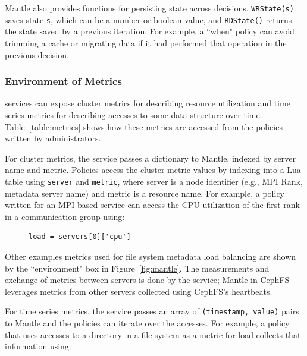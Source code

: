 Mantle also provides functions for persisting state across decisions.
\texttt{WRState(s)} saves state \texttt{s}, which can be a number or boolean
value, and \texttt{RDState()} returns the state saved by a previous iteration.
For example, a ``when" policy can avoid trimming a cache or migrating data if
it had performed that operation in the previous decision.


\subsubsection{Environment of Metrics} services can expose cluster metrics for
describing resource utilization and time series metrics for describing accesses
to some data structure over time. Table~\ref{table:metrics} shows how these
metrics are accessed from the policies written by administrators. 

For cluster metrics, the service passes a dictionary to Mantle, indexed by
server name and metric. Policies access the cluster metric values by indexing
into a Lua table using \texttt{server} and \texttt{metric}, where server is a
node identifier ({e.g.}, MPI Rank, metadata server name) and metric is a
resource name.  For example, a policy written for an MPI-based service can
access the CPU utilization of the first rank in a communication group using:

\begin{figure}[h]
\footnotesize
\begin{verbatim}
load = servers[0]['cpu']
\end{verbatim}
\end{figure}

Other examples metrics used for file system metadata load balancing are shown
by the ``environment" box in Figure~\ref{fig:mantle}. The measurements and
exchange of metrics between servers is done by the service; Mantle in CephFS
leverages metrics from other servers collected using CephFS's heartbeats.

For time series metrics, the service passes an array of \texttt{(timestamp,
value)} pairs to Mantle and the policies can iterate over the accesses. For
example, a policy that uses accesses to a directory in a file system as a
metric for load collects that information using:

